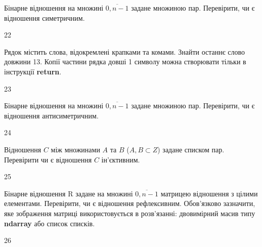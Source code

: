 Бінарне відношення на множині $\overline{0,n-1}$ задане множиною пар. Перевірити, чи є відношення симетричним.
\\\par
22 














Рядок містить слова, відокремлені крапками та комами. Знайти останнє слово довжини 13. Копії частини рядка довші 1 символу можна створювати тільки в інструкції \textbf{return}.
\\\par
23 














Бінарне відношення на множині $\overline{0,n-1}$ задане множиною пар. Перевірити, чи є відношення антисиметричним.
\\\par
24 














Відношення $C$ між множинами $A$ та $B$ ($A, B\subset Z$) задане списком пар. Перевірити чи є відношення $C$ ін'єктивним.
\\\par
25 














Бінарне відношення R задане на множині $\overline{0,n-1}$ матрицею відношення з цілими елементами.  Перевірити, чи є відношення рефлексивним. Обов'язково зазначити, яке зображення матриці використовується в розв'язанні: двовимірний масив типу \textbf{ndarray} або список списків.
\\\par
26 














